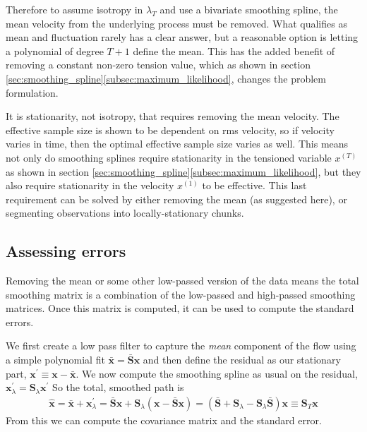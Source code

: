 \documentclass{ametsoc}
\begin{document}
Therefore to assume isotropy in $\lambda_T$ and use a bivariate smoothing spline, the mean velocity from the underlying process must be removed. What qualifies as mean and fluctuation rarely has a clear answer, but a reasonable option is letting a polynomial of degree $T+1$ define the mean. This has the added benefit of removing a constant non-zero tension value, which as shown in section \ref{sec:smoothing_spline}\ref{subsec:maximum_likelihood}, changes the problem formulation. 

It is stationarity, not isotropy, that requires removing the mean velocity. The effective sample size is shown to be dependent on rms velocity, so if velocity varies in time, then the optimal effective sample size varies as well. This means not only do smoothing splines require stationarity in the tensioned variable $x^{(T)}$ as shown in section \ref{sec:smoothing_spline}\ref{subsec:maximum_likelihood}, but they also require stationarity in the velocity $x^{(1)}$ to be effective. This last requirement can be solved by either removing the mean (as suggested here), or segmenting observations into locally-stationary chunks.

\subsection{Assessing errors}
\label{subsec:errors_wit_mean}

Removing the mean or some other low-passed version of the data means the total smoothing matrix is a combination of the low-passed and high-passed smoothing matrices. Once this matrix is computed, it can be used to compute the standard errors.

We first create a low pass filter to capture the \emph{mean} component of the flow using a simple polynomial fit $
\bar{\mathbf{x}} = \bar{\mathbf{S}} \mathbf{x}
$
and then define the residual as our stationary part,
$
\mathbf{x}^\prime \equiv \mathbf{x} - \bar{\mathbf{x}}.
$
We now compute the smoothing spline as usual on the residual,
$
\mathbf{x}^\prime_\lambda = \mathbf{S}_\lambda \mathbf{x}^\prime
$
So the total, smoothed path is
\begin{align}
\hat{\mathbf{x}} = \bar{\mathbf{x}} + \mathbf{x}^\prime_\lambda = \bar{\mathbf{S}} \mathbf{x} + \mathbf{S}_\lambda \left( \mathbf{x} - \bar{\mathbf{S}} \mathbf{x} \right) = \left(\bar{\mathbf{S}} + \mathbf{S}_\lambda - \mathbf{S}_\lambda \bar{\mathbf{S}}\right)\mathbf{x}
\equiv \mathbf{S}_T \mathbf{x}
\end{align}
From this we can compute the covariance matrix and the standard error.
\end{document}
